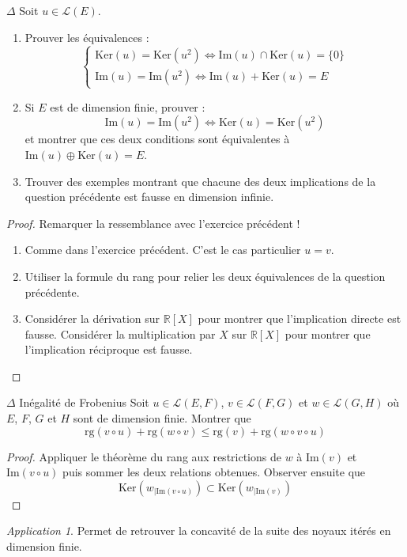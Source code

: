 \documentclass[french,a4paper]{article}
\newcommand{\R}{\mathbb{R}}
\renewcommand{\ker}{\text{Ker}}
\newcommand{\im}{\text{Im}}
\theoremstyle{plain}
\theoremstyle{definition}
\theoremstyle{remark}
\newtheorem*{app}{Application}
\begin{document}
\begin{ex}[Moulin.36]{$\Delta$}
	Soit $u\in\mathcal{L}(E)$.
	\begin{enumerate}
		\item Prouver les équivalences : $$\begin{cases}
			\text{Ker}(u)=\text{Ker}(u^2)\iff\text{Im}(u)\cap\text{Ker}(u)=\{0\}\\
			\text{Im}(u)=\text{Im}(u^2)\iff \text{Im}(u)+\text{Ker}(u)=E
		\end{cases}$$
		\item Si $E$ est de dimension finie, prouver : $$\text{Im}(u)=\text{Im}(u^2)\iff\ker(u)=\ker(u^2)$$ et montrer que ces deux conditions sont équivalentes à $\text{Im}(u)\oplus\ker(u)=E$.
		\item Trouver des exemples montrant que chacune des deux implications de la question précédente est fausse en dimension infinie.
	\end{enumerate}
\end{ex}
\begin{proof}
	Remarquer la ressemblance avec l'exercice précédent !
	\begin{enumerate}
		\item Comme dans l'exercice précédent. C'est le cas particulier $u=v$.
		\item Utiliser la formule du rang pour relier les deux équivalences de la question précédente.
		\item Considérer la dérivation sur $\R[X]$ pour montrer que l'implication directe est fausse. Considérer la multiplication par $X$ sur $\R[X]$ pour montrer que l'implication réciproque est fausse.
	\end{enumerate}
\end{proof}

\begin{ex}[Moulin.37]{$\Delta$ Inégalité de Frobenius}
	Soit $u\in\mathcal{L}(E,F)$, $v\in\mathcal{L}(F,G)$ et $w\in\mathcal{L}(G,H)$ où $E$, $F$, $G$ et $H$ sont de dimension finie. Montrer que $$\text{rg}(v\circ u)+\text{rg}(w\circ v)\leqslant\text{rg}(v)+\text{rg}(w\circ v\circ u)$$
\end{ex}
\begin{proof}
	Appliquer le théorème du rang aux restrictions de $w$ à $\im(v)$ et $\im(v\circ u)$ puis sommer les deux relations obtenues. Observer ensuite que $$\ker(w_{\mid\im(v\circ u)})\subset\ker(w_{\mid\im(v)})$$
\end{proof}
\begin{app}
	Permet de retrouver la concavité de la suite des noyaux itérés en dimension finie.
\end{app}
\end{document}
